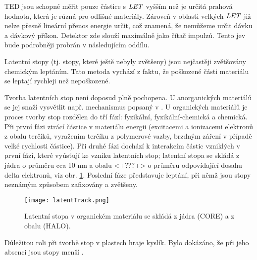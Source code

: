TED jsou schopné měřit pouze částice s $\mathit{LET}$ vyšším než je určitá prahová hodnota, která je různá pro odlišné materiály. Zároveň v oblasti velkých $\mathit{LET}$ již nelze přesně lineární přenos energie určit, což znamená, že nemůžeme určit dávku a dávkový příkon. Detektor zde slouží maximálně jako čítač impulzů. Tento jev bude podrobněji probrán v následujícím oddílu.

Latentní stopy (tj. stopy, které ještě nebyly zvětšeny) jsou nejčastěji zvětšovány chemickým leptáním. Tato metoda vychází z faktu, že poškozené části materiálu se leptají rychleji než nepoškozené.

Tvorba latentních stop není doposud plně pochopena. U anorganických materiálů se jej snaží vysvětlit např. mechanismus popsaný v \cite{spikeModel}. U organických materiálů je proces tvorby stop rozdělen do tří fází: fyzikální, fyzikální-chemická a chemická. Při první fázi ztrácí částice v materiálu energii (excitacemi a ionizacemi elektronů z obalu terčíků, vyražením terčíku z polymerové vazby, brzdným záření v případě velké rychlosti částice). Při druhé fázi dochází k interakcím částic vzniklých v první fázi, které vyúsťují ke vzniku latentních stop; latentní stopa se skládá z jádra o průměru cca 10 nm a obalu <+???+> o průměru odpovídající dosahu delta elektronů, viz obr. \ref{fig:detektory_latentTrack}. Poslední fáze představuje leptání, při němž jsou stopy neznámým způsobem zafixovány a zvětšeny.
\begin{figure}[h]
  \centering
  \texttt{[image: latentTrack.png]}
  \caption{Latentní stopa v organickém materiálu se skládá z jádra (CORE) a z obalu (HALO).}
  \label{fig:detektory_latentTrack}
\end{figure}

Důležitou roli při tvorbě stop v plastech hraje kyslík. Bylo dokázáno, že při jeho absenci jsou stopy menší \cite{kyslikTED}.  

